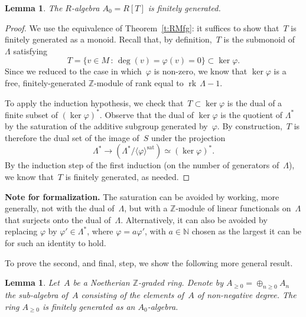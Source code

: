 \documentclass{amsart}
\newcommand{\N}{\mathbb{N}}
\newcommand{\Z}{\mathbb{Z}}
\newcommand{\Az}{A_{\geq0}}
\newcommand{\form}[1]{\medskip
\parbox{330pt}
{\small{{\textbf{Note for formalization.}}
#1}}
\medskip}
\DeclareMathOperator{\rk}{rk\,}
\newtheorem{lemma}[theorem]{Lemma}
\begin{document}
\begin{lemma}
The $R$-algebra $A_0 = R[T]$ is finitely generated.
\end{lemma}
\begin{proof}
We use the equivalence of Theorem~\ref{t:RMfg}: it suffices to show that~$T$ is finitely generated as a monoid.  Recall that, by definition,~$T$ is the submonoid of~$\Lambda$ satisfying
\[
T=\{v \in M \,:\, \deg(v) = \varphi (v) = 0\} \subset \ker \varphi .
\]
Since we reduced to the case in which~$\varphi$ is non-zero, we know that $\ker \varphi$ is a free, finitely-generated $\Z$-module of rank equal to ${\rk} \Lambda - 1$.

To apply the induction hypothesis, we check that~$T \subset \ker \varphi$ is the dual of a finite subset of $(\ker \varphi)^*$.  Observe that the dual of $\ker \varphi$ is the quotient of $\Lambda^*$ by the saturation of the additive subgroup generated by~$\varphi$.  By construction,~$T$ is therefore the dual set of the image of~$S$ under the projection
\[
\Lambda^* \to \left( \Lambda^* / \langle \varphi \rangle^{\textrm{sat}}  \right) \simeq \left( \ker \varphi \right)^*.
\]
By the induction step of the first induction (on the number of generators of~$\Lambda$), we know that~$T$ is finitely generated, as needed.
\end{proof}


\form{The saturation can be avoided by working, more generally, not with the dual of~$\Lambda$, but with a $\Z$-module of linear functionals on~$\Lambda$ that surjects onto the dual of~$\Lambda$.  Alternatively, it can also be avoided by replacing $\varphi$ by $\varphi' \in \Lambda^*$, where $\varphi = a \varphi'$, with $a \in \N$ chosen as the largest it can be for such an identity to hold.}

To prove the second, and final, step, we show the following more general result.

\begin{lemma}
Let~$A$ be a Noetherian $\Z$-graded ring.  Denote by $\Az = \oplus_{n \geq 0} A_n$ the sub-algebra of~$A$ consisting of the elements of~$A$ of non-negative degree.  The ring $\Az$ is finitely generated as an $A_0$-algebra.
\end{lemma}
\end{document}
